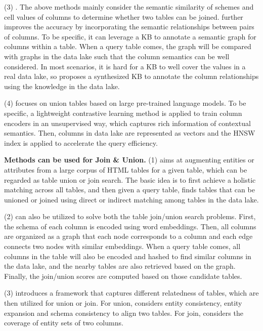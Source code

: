   \noindent  (3) \santos. The above methods mainly consider  the semantic similarity of  schemes and cell values of columns to determine whether two tables can be joined.
   \santos further improves the accuracy by incorporating the semantic relationships between pairs of columns. To be specific,  it can leverage a KB to annotate a semantic graph for columns within a table. When a query table comes, the graph will be compared with graphs in the data lake such that the column semantics can be well considered. In most scenarios, it is hard for a KB to well cover the values in a real data lake, so \santos proposes a synthesized KB to annotate the column relationships using the knowledge in the data lake.

 \noindent  (4) \starmie focuses on union tables based on large  pre-trained language models. To be specific, a lightweight contrastive learning method is applied to train 
column encoders in an unsupervised way, which captures rich information of contextual semantics. Then, columns in data lake are represented as vectors and the HNSW index is applied to accelerate the query efficiency.


\noindent\textbf{Methods can be used for Join \& Union.}
  (1) \infogather aims at augmenting entities or attributes from a large corpus of HTML tables for a given table, which can be regarded as table union or join search. The basic idea is to first achieve a holistic matching across all tables, and then  given a query table,  \infogather finds tables that can be unioned or joined using direct or indirect matching among tables in the data lake.
 
 
  \noindent  (2) \aurum can also be utilized to solve  both the table join/union search problems. First, the schema of each column is encoded using word embeddings. Then, all columns are organized as a graph that each node corresponds to a column and each edge connects two nodes with similar embeddings. When a query table comes, all columns in the table will also be encoded and hashed to find similar columns in the data lake, and  the nearby tables are also retrieved based on the graph. Finally, the join/union scores are computed based on those candidate tables.  
  
    \noindent  (3) \frt introduces a framework that captures different relatedness of tables, which are then utilized for union or join. For union,  \frt considers entity consistency, entity expansion and schema consistency to align two tables. For join, \frt considers the coverage of entity sets of two columns.

